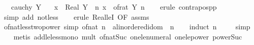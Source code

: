 \begin{isabellebody}
\ \ \ {\isachardoublequoteopen}cauchy\ Y{\isachardoublequoteclose}\isanewline
\ \ \ {\isachardoublequoteopen}x\ {\isacharless}{\kern0pt}\ Real\ Y\ {\isasymLongrightarrow}\ {\isasymexists}n{\isachardot}{\kern0pt}\ x\ {\isacharless}{\kern0pt}\ of{\isacharunderscore}{\kern0pt}rat\ {\isacharparenleft}{\kern0pt}Y\ n{\isacharparenright}{\kern0pt}{\isachardoublequoteclose}\isanewline
%
\isadelimproof
\ \ %
\endisadelimproof
%
\isatagproof
{}\isamarkupfalse%
\ {\isacharparenleft}{\kern0pt}erule\ contrapos{\isacharunderscore}{\kern0pt}pp{\isacharparenright}{\kern0pt}\isanewline
\ \ \isamarkupfalse%
\ {\isacharparenleft}{\kern0pt}simp\ add{\isacharcolon}{\kern0pt}\ not{\isacharunderscore}{\kern0pt}less{\isacharparenright}{\kern0pt}\isanewline
\ \ \isamarkupfalse%
\ {\isacharparenleft}{\kern0pt}erule\ Real{\isacharunderscore}{\kern0pt}leI\ {\isacharbrackleft}{\kern0pt}OF\ assms{\isacharbrackright}{\kern0pt}{\isacharparenright}{\kern0pt}\isanewline
\ \ \isamarkupfalse%
%
\endisatagproof
{\isafoldproof}%
%
\isadelimproof
\isanewline
%
\endisadelimproof
\isanewline
{}\isamarkupfalse%
\ of{\isacharunderscore}{\kern0pt}nat{\isacharunderscore}{\kern0pt}less{\isacharunderscore}{\kern0pt}two{\isacharunderscore}{\kern0pt}power\ {\isacharbrackleft}{\kern0pt}simp{\isacharbrackright}{\kern0pt}{\isacharcolon}{\kern0pt}\ {\isachardoublequoteopen}of{\isacharunderscore}{\kern0pt}nat\ n\ {\isacharless}{\kern0pt}\ {\isacharparenleft}{\kern0pt}{}{\isacharcolon}{\kern0pt}{\isacharcolon}{\kern0pt}{\isacharprime}{\kern0pt}a{\isacharcolon}{\kern0pt}{\isacharcolon}{\kern0pt}linordered{\isacharunderscore}{\kern0pt}idom{\isacharparenright}{\kern0pt}\ {\isacharcircum}{\kern0pt}\ n{\isachardoublequoteclose}\isanewline
%
\isadelimproof
\ \ %
\endisadelimproof
%
\isatagproof
{}\isamarkupfalse%
\ {\isacharparenleft}{\kern0pt}induct\ n{\isacharparenright}{\kern0pt}\isanewline
\ \ \ \isamarkupfalse%
\ simp\isanewline
\ \ \isamarkupfalse%
\ {\isacharparenleft}{\kern0pt}metis\ add{\isacharunderscore}{\kern0pt}le{\isacharunderscore}{\kern0pt}less{\isacharunderscore}{\kern0pt}mono\ mult{\isacharunderscore}{\kern0pt}{}\ of{\isacharunderscore}{\kern0pt}nat{\isacharunderscore}{\kern0pt}Suc\ one{\isacharunderscore}{\kern0pt}le{\isacharunderscore}{\kern0pt}numeral\ one{\isacharunderscore}{\kern0pt}le{\isacharunderscore}{\kern0pt}power\ power{\isacharunderscore}{\kern0pt}Suc{\isacharparenright}{\kern0pt}\isanewline

\end{isabellebody}
